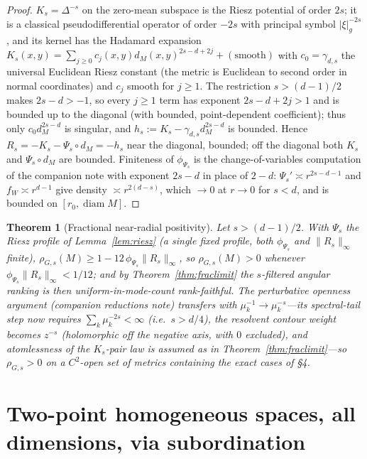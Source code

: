 \documentclass[11pt]{article}
\newtheorem{theorem}{Theorem}
\theoremstyle{remark}
\newcommand{\diam}{\operatorname{diam}}
\newcommand{\dM}{d_M}
\newcommand{\Rem}{R}
\begin{document}
\begin{proof}
$K_s=\Delta^{-s}$ on the zero-mean subspace is the Riesz potential of order $2s$; it is a
classical pseudodifferential operator of order $-2s$ with principal symbol
$\lvert\xi\rvert_g^{-2s}$, and its kernel has the Hadamard expansion
$K_s(x,y)=\sum_{j\ge0}c_j(x,y)\dM(x,y)^{2s-d+2j}+(\text{smooth})$ with $c_0=\gamma_{d,s}$ the
universal Euclidean Riesz constant (the metric is Euclidean to second order in normal
coordinates) and $c_j$ smooth for $j\ge1$. The restriction $s>(d-1)/2$ makes $2s-d>-1$, so
every $j\ge1$ term has exponent $2s-d+2j>1$ and is bounded up to the diagonal (with bounded,
point-dependent coefficient); thus only $c_0\dM^{2s-d}$ is singular, and
$h_s:=K_s-\gamma_{d,s}\dM^{2s-d}$ is bounded. Hence $\Rem_s=-K_s-\Psi_s\circ\dM=-h_s$ near the
diagonal, bounded; off the diagonal both $K_s$ and $\Psi_s\circ\dM$ are bounded. Finiteness of
$\phi_{\Psi_s}$ is the change-of-variables computation of the companion note with exponent
$2s-d$ in place of $2-d$: $\Psi_s'\asymp r^{2s-d-1}$ and $f_W\asymp r^{d-1}$ give density
$\asymp r^{2(d-s)}$, which $\to0$ at $r\to0$ for $s<d$, and is bounded on $[r_0,\diam M]$.
\end{proof}

\begin{theorem}[Fractional near-radial positivity]\label{thm:fracnear}
Let $s>(d-1)/2$. With $\Psi_s$ the Riesz profile of Lemma~\ref{lem:riesz} (a \emph{single}
fixed profile, both $\phi_{\Psi_s}$ and $\lVert\Rem_s\rVert_\infty$ finite),
$\rho_{G,s}(M)\ge1-12\,\phi_{\Psi_s}\lVert\Rem_s\rVert_\infty$, so $\rho_{G,s}(M)>0$ whenever
$\phi_{\Psi_s}\lVert\Rem_s\rVert_\infty<1/12$; and by Theorem~\ref{thm:fraclimit} the
$s$-filtered angular ranking is then uniform-in-mode-count rank-faithful. The perturbative
openness argument (companion reductions note) transfers with $\mu_k^{-1}\to\mu_k^{-s}$---its
spectral-tail step now requires $\sum_k\mu_k^{-2s}<\infty$ (i.e.\ $s>d/4$), the resolvent
contour weight becomes $z^{-s}$ (holomorphic off the negative axis, with $0$ excluded), and
atomlessness of the $K_s$-pair law is assumed as in Theorem~\ref{thm:fraclimit}---so
$\rho_{G,s}>0$ on a $C^2$-open set of metrics containing the exact cases of \S4.
\end{theorem}

\section{Two-point homogeneous spaces, all dimensions, via subordination}
\end{document}
